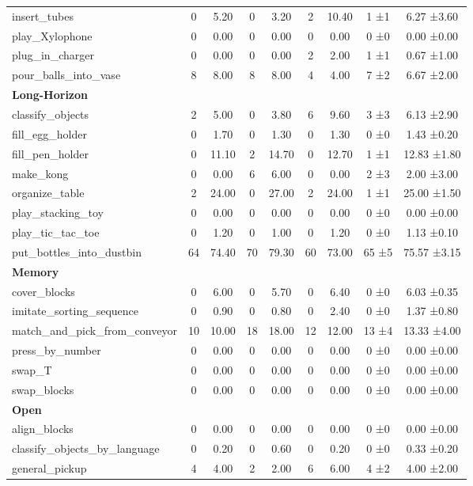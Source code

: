 \begin{table}[H]
{\begin{tabular}{l|c|c|c|c|c|c|c|c}
insert\_tubes & 0 & 5.20 & 0 & 3.20 & 2 & 10.40 & 1 ±1 & 6.27 ±3.60 \\
play\_Xylophone & 0 & 0.00 & 0 & 0.00 & 0 & 0.00 & 0 ±0 & 0.00 ±0.00 \\
plug\_in\_charger & 0 & 0.00 & 0 & 0.00 & 2 & 2.00 & 1 ±1 & 0.67 ±1.00 \\
pour\_balls\_into\_vase & 8 & 8.00 & 8 & 8.00 & 4 & 4.00 & 7 ±2 & 6.67 ±2.00 \\
\hline
\multicolumn{9}{l}{\textbf{Long-Horizon}} \\
classify\_objects & 2 & 5.00 & 0 & 3.80 & 6 & 9.60 & 3 ±3 & 6.13 ±2.90 \\
fill\_egg\_holder & 0 & 1.70 & 0 & 1.30 & 0 & 1.30 & 0 ±0 & 1.43 ±0.20 \\
fill\_pen\_holder & 0 & 11.10 & 2 & 14.70 & 0 & 12.70 & 1 ±1 & 12.83 ±1.80 \\
make\_kong & 0 & 0.00 & 6 & 6.00 & 0 & 0.00 & 2 ±3 & 2.00 ±3.00 \\
organize\_table & 2 & 24.00 & 0 & 27.00 & 2 & 24.00 & 1 ±1 & 25.00 ±1.50 \\
play\_stacking\_toy & 0 & 0.00 & 0 & 0.00 & 0 & 0.00 & 0 ±0 & 0.00 ±0.00 \\
play\_tic\_tac\_toe & 0 & 1.20 & 0 & 1.00 & 0 & 1.20 & 0 ±0 & 1.13 ±0.10 \\
put\_bottles\_into\_dustbin & 64 & 74.40 & 70 & 79.30 & 60 & 73.00 & 65 ±5 & 75.57 ±3.15 \\
\hline
\multicolumn{9}{l}{\textbf{Memory}} \\
cover\_blocks & 0 & 6.00 & 0 & 5.70 & 0 & 6.40 & 0 ±0 & 6.03 ±0.35 \\
imitate\_sorting\_sequence & 0 & 0.90 & 0 & 0.80 & 0 & 2.40 & 0 ±0 & 1.37 ±0.80 \\
match\_and\_pick\_from\_conveyor & 10 & 10.00 & 18 & 18.00 & 12 & 12.00 & 13 ±4 & 13.33 ±4.00 \\
press\_by\_number & 0 & 0.00 & 0 & 0.00 & 0 & 0.00 & 0 ±0 & 0.00 ±0.00 \\
swap\_T & 0 & 0.00 & 0 & 0.00 & 0 & 0.00 & 0 ±0 & 0.00 ±0.00 \\
swap\_blocks & 0 & 0.00 & 0 & 0.00 & 0 & 0.00 & 0 ±0 & 0.00 ±0.00 \\
\hline
\multicolumn{9}{l}{\textbf{Open}} \\
align\_blocks & 0 & 0.00 & 0 & 0.00 & 0 & 0.00 & 0 ±0 & 0.00 ±0.00 \\
classify\_objects\_by\_language & 0 & 0.20 & 0 & 0.60 & 0 & 0.20 & 0 ±0 & 0.33 ±0.20 \\
general\_pickup & 4 & 4.00 & 2 & 2.00 & 6 & 6.00 & 4 ±2 & 4.00 ±2.00 \\

\end{tabular}}
\end{table}
